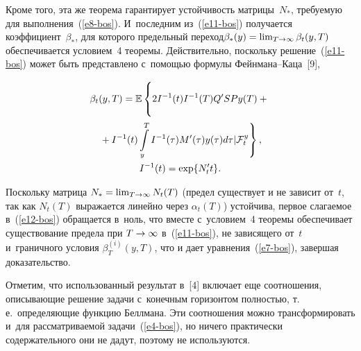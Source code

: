 \begin{multicols}{2}
     \vspace*{-3pt}
     
     \noindent
     Кроме того, эта же теорема гарантирует устой\-чи\-вость мат\-ри\-цы~$N_*$, 
тре\-бу\-емую для выполнения~(\ref{e8-bos}).
     И~последним из~(\ref{e11-bos}) получается коэффициент~$\beta_*$, 
для которого предельный переход\linebreak $\beta_*(y)\hm= \lim_{T\to\infty} 
\beta_t(y,T)$ обеспечивается условием~4 тео\-ре\-мы. Действительно, 
поскольку решение~(\ref{e11-bos}) может быть представлено с~по\-мощью 
формулы Фейн\-ма\-на--Ка\-ца~[9],

\vspace*{-3pt}
     
     \noindent
     \begin{multline}
     \beta_t(y,T) =\mathbb{E}\left\{ 
     \vphantom{\int\limits_y^{{T}}}
     2I^{-1}(t) I^{-1}(T) Q^\prime SPy(T)+{}\right.\\
\left.     {}+ I^{-1}(t)\int\limits_y^{{T}} I^{-1}(\tau) M^\prime(\tau) y(\tau)d\tau\vert 
\mathcal{F}_t^y\right\},\\
     I^{-1}(t)=\exp \{ N_t^\prime t\}.
     \label{e12-bos}
     \end{multline}
     
     \vspace*{-3pt}
     
     
     Поскольку матрица $N_*\hm= \lim_{T\to\infty} N_t(T)$ (предел 
существует и не зависит от~$t$, так как $N_t(T)$ выражается линейно через 
$\alpha_t(T)$) устойчива, первое сла\-га\-емое в~(\ref{e12-bos}) обращается 
в~ноль, что вместе с~условием~4 тео\-ре\-мы обеспечивает существование 
предела при $T\hm\to \infty$ в~(\ref{e11-bos}), не зависящего от~$t$ 
и~граничного условия $\beta_T^{(i)}(y,T)$, что и дает  
уравнения~(\ref{e7-bos}), завершая доказательство.
     
     \smallskip
     
     Отметим, что использованный результат в~[4] включает еще 
соотношения, опи\-сы\-ва\-ющие решение задачи с~конечным горизонтом 
полностью, т.\,е.\ опре\-де\-ля\-ющие функцию Беллмана. Эти соотношения 
можно трансформировать и~для рассматриваемой задачи~(\ref{e4-bos}), но 
ничего практически содержательного они не дадут, поэтому не 
используются.
     

\end{multicols}
